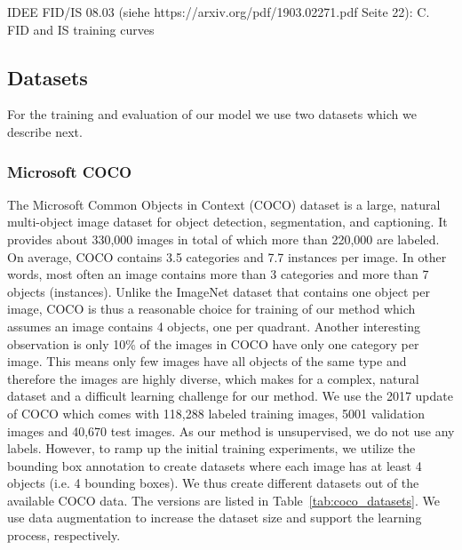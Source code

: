 \documentclass[12pt,a4paper]{article}
\begin{document}
\par IDEE FID/IS 08.03 (siehe https://arxiv.org/pdf/1903.02271.pdf Seite 22): C. FID and IS training curves
    
\subsection{Datasets}
For the training and evaluation of our model we use two datasets which we describe next.

\subsubsection{Microsoft COCO}
The Microsoft Common Objects in Context (COCO) dataset \cite{MsCoco} is a large, natural multi-object image dataset for object detection, segmentation, and captioning. It provides about 330,000 images in total of which more than 220,000 are labeled. On average, COCO contains 3.5 categories and 7.7 instances per image. In other words, most often an image contains more than 3 categories and more than 7 objects (instances). Unlike the ImageNet dataset that contains one object per image, COCO is thus a reasonable choice for training of our method which assumes an image contains 4 objects, one per quadrant. Another interesting observation is only 10\% of the images in COCO have only one category per image. This means only few images have all objects of the same type and therefore the images are highly diverse, which makes for a complex, natural dataset and a difficult learning challenge for our method. We use the 2017 update of COCO which comes with 118,288 labeled training images, 5001 validation images and 40,670 test images. As our method is unsupervised, we do not use any labels. However, to ramp up the initial training experiments, we utilize the bounding box annotation to create datasets where each image has at least 4 objects (i.e. 4 bounding boxes). We thus create different datasets out of the available COCO data. The versions are listed in Table~\ref{tab:coco_datasets}. We use data augmentation to increase the dataset size and support the learning process, respectively.
\end{document}
